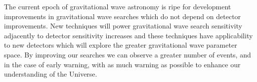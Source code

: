 The current epoch of gravitational wave astronomy is ripe for development improvements in gravitational wave searches which do not depend on detector improvements. New techniques will power gravitational wave search sensitivity adjacently to detector sensitivity increases and these techniques have applicability to new detectors which will explore the greater gravitational wave parameter space. By improving our searches we can observe a greater number of events, and in the case of early warning, with as much warning as possible to enhance our understanding of the Universe.